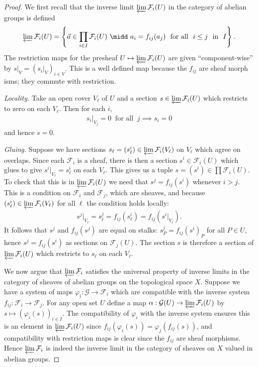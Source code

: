 \begin{problemset}
	\begin{proof}
		We first recall that the inverse limit $\varprojlim \mathcal F_i(U)$ in the category of abelian groups is defined
		\begin{align*}
			\varprojlim \mathcal F_i(U) = \left\{\vec a \in \prod_{i\in I}\mathcal F_i(U) ~\midd~ a_i = f_{ij}(a_j) ~\text{ for all } ~ i\leq j ~\text{ in } ~ I\right\}.
		\end{align*}
		The restriction maps for the presheaf $U\mapsto \varprojlim \mathcal F_i(U)$ are given ``component-wise'' by $s|_V = (s_i|_{V})_{i\in V}$. This is a well defined map because the $f_{ij}$ are sheaf morph isms; they commute with restriction.

		\emph{Locality.} Take an open cover $V_\ell$ of $U$ and a section $s\in \varprojlim \mathcal F_i(U)$ which restricts to zero on each $V_\ell$. Then for each $i$,
		\begin{align*}
			s_i|_{V_j} = 0 ~\text{ for all }~ j \implies s_i = 0
		\end{align*}
		and hence $s = 0$.

		\emph{Gluing.} Suppose we have sections $s_\ell = (s_\ell^i) \in \varprojlim \mathcal F_i(V_\ell)$ on $V_\ell$ which agree on overlaps. Since each $\mathcal F_i$ is a sheaf, there is then a section $s^i \in \mathcal F_i(U)$ which glues to give $s^i|_{V_\ell} = s^i_\ell$ on each $V_\ell$. This gives us a tuple $s = (s^i)\in \prod \mathcal F_i(U)$. To check that this is in $\varprojlim \mathcal F_i(U)$ we need that $s^j = f_{ij}(s^i)$ whenever $i > j$. This is a condition on $\mathcal F_i$ and $\mathcal F_j$, which are sheaves, and because $(s_\ell^i) \in \varprojlim \mathcal F_i(V_\ell)$ for all $\ell$ the condition holds locally:
		\begin{align*}
			s^j|_{V_\ell} = s^j_\ell = f_{ij}(s^i_\ell) = f_{ij}(s^i|_{V_\ell}).
		\end{align*}
		It follows that $s^j$ and $f_{ij}(s^j)$ are equal on stalks: $s^j_P = f_{ij}(s^i)_P$ for all $P\in U$, hence $s^j = f_{ij}(s^i)$ as sections on $\mathcal F_j(U)$. The section $s$ is therefore a section of $\varprojlim \mathcal F_i(U)$ which restricts to $s_\ell$ on each $V_\ell$.

		\bigskip

		We now argue that $\varprojlim \mathcal F_i$ satisfies the universal property of inverse limits in the category of sheaves of abelian groups on the topological space $X$. Suppose we have a system of maps $\varphi_i:\mathcal G\to \mathcal F_i$ which are compatible with the inverse system $f_{ij}:\mathcal F_i\to \mathcal F_j$. For any open set $U$ define a map $\alpha:\mathcal G(U)\to \varprojlim \mathcal F_i(U)$ by $s\mapsto (\varphi_i(s))_{i\in I}$. The compatibility of $\varphi_i$ with the inverse system ensures this is an element in $\varprojlim \mathcal F_i(U)$ since $f_{ij}(\varphi_i(s)) = \varphi_j(f_{ij}(s))$, and compatibility with restriction maps is clear since the $f_{ij}$ are sheaf morphisms. Hence $\varprojlim \mathcal F_i$ is indeed the inverse limit in the category of sheaves on $X$ valued in abelian groups.
	\end{proof}


\end{problemset}
